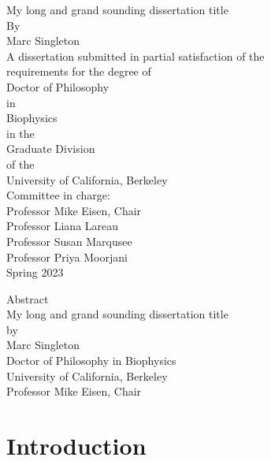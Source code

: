 \documentclass[11pt,letterpaper,oneside]{book}
\begin{document}
\begin{titlepage}
    \begin{center}
    My long and grand sounding dissertation title\\
    \bigskip
    By\\
    Marc Singleton\\
    \vfill
    A dissertation submitted in partial satisfaction of the\\
    requirements for the degree of\\
    Doctor of Philosophy\\
    in\\
    Biophysics\\
    in the\\
    Graduate Division\\
    of the\\
    University of California, Berkeley\\
    \vfill
    Committee in charge:\\
    Professor Mike Eisen, Chair\\
    Professor Liana Lareau\\
    Professor Susan Marqusee\\
    Professor Priya Moorjani\\
    \bigskip
    Spring 2023\\
    \end{center}
\end{titlepage}

\begin{center}
    Abstract\\
    \bigskip
    My long and grand sounding dissertation title\\
    by\\
    Marc Singleton\\
    \bigskip
    Doctor of Philosophy in Biophysics\\
    University of California, Berkeley\\
    Professor Mike Eisen, Chair\\
    \bigskip
\end{center}
\lipsum[1-5]

\tableofcontents
\setcounter{page}{1}  %

\chapter{Introduction}
\graphicspath{{introduction/figures/}}

\end{document}
